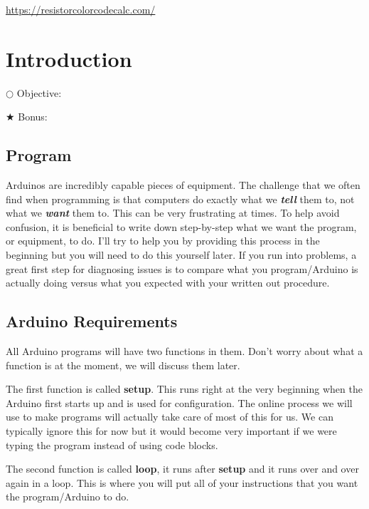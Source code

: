 \documentclass[12pt]{article}
\begin{document}
	
	
	\url{https://resistorcolorcodecalc.com/}
	
	\section{Introduction}
	
	
	\noindent $\bigcirc$ Objective: 
	
	\noindent $\bigstar$ Bonus: 
	
	\subsection{Program}
	
	Arduinos are incredibly capable pieces of equipment. The challenge that we often find when programming is that computers do exactly what we \textbf{\textit{tell}} them to, not what we \textbf{\textit{want}} them to. This can be very frustrating at times. To help avoid confusion, it is beneficial to write down step-by-step what we want the program, or equipment, to do. I'll try to help you by providing this process in the beginning but you will need to do this yourself later. If you run into problems, a great first step for diagnosing issues is to compare what you program/Arduino is actually doing versus what you expected with your written out procedure.
	
	\subsection{Arduino Requirements}
	
	All Arduino programs will have two functions in them. Don't worry about what a function is at the moment, we will discuss them later.
	
	The first function is called \textbf{setup}. This runs right at the very beginning when the Arduino first starts up and is used for configuration. The online process we will use to make programs will actually take care of most of this for us. We can typically ignore this for now but it would become very important if we were typing the program instead of using code blocks.
	
	The second function is called \textbf{loop}, it runs after \textbf{setup} and it runs over and over again in a loop. This is where you will put all of your instructions that you want the program/Arduino to do.
	
\end{document}
